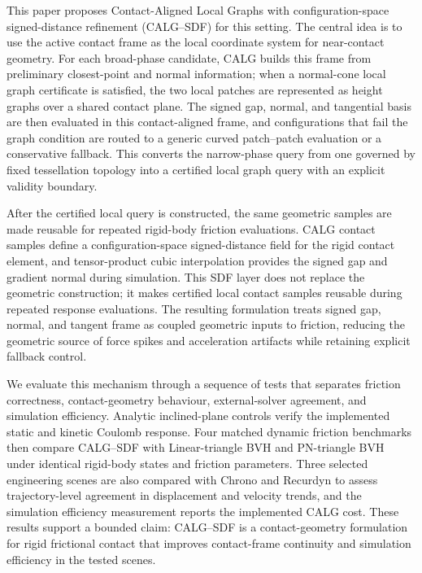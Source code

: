 \documentclass[preprint,12pt]{elsarticle}
\newcommand{\calg}{\textsc{CALG}}
\begin{document}
This paper proposes Contact-Aligned Local Graphs with configuration-space signed-distance refinement (\calg{}--SDF) for this setting. The central idea is to use the active contact frame as the local coordinate system for near-contact geometry. For each broad-phase candidate, \calg{} builds this frame from preliminary closest-point and normal information; when a normal-cone local graph certificate is satisfied, the two local patches are represented as height graphs over a shared contact plane. The signed gap, normal, and tangential basis are then evaluated in this contact-aligned frame, and configurations that fail the graph condition are routed to a generic curved patch--patch evaluation or a conservative fallback. This converts the narrow-phase query from one governed by fixed tessellation topology into a certified local graph query with an explicit validity boundary.

After the certified local query is constructed, the same geometric samples are made reusable for repeated rigid-body friction evaluations. \calg{} contact samples define a configuration-space signed-distance field for the rigid contact element, and tensor-product cubic interpolation provides the signed gap and gradient normal during simulation. This SDF layer does not replace the geometric construction; it makes certified local contact samples reusable during repeated response evaluations. The resulting formulation treats signed gap, normal, and tangent frame as coupled geometric inputs to friction, reducing the geometric source of force spikes and acceleration artifacts while retaining explicit fallback control.

We evaluate this mechanism through a sequence of tests that separates friction correctness, contact-geometry behaviour, external-solver agreement, and simulation efficiency. Analytic inclined-plane controls verify the implemented static and kinetic Coulomb response. Four matched dynamic friction benchmarks then compare \calg{}--SDF with Linear-triangle BVH and PN-triangle BVH under identical rigid-body states and friction parameters. Three selected engineering scenes are also compared with Chrono and Recurdyn to assess trajectory-level agreement in displacement and velocity trends, and the simulation efficiency measurement reports the implemented CALG cost. These results support a bounded claim: \calg{}--SDF is a contact-geometry formulation for rigid frictional contact that improves contact-frame continuity and simulation efficiency in the tested scenes.
\end{document}
